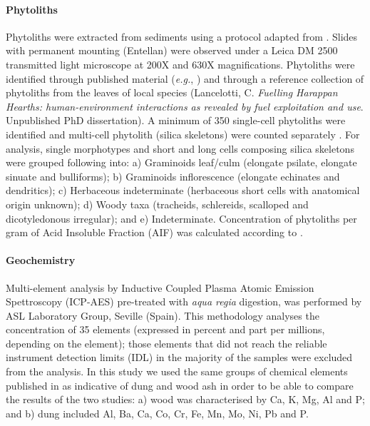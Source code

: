 \documentclass[authoryear,preprint,review,12pt]{elsarticle}
\begin{document}
\paragraph{Phytoliths}
Phytoliths were extracted from sediments using a protocol adapted from \citet{Madella1998}. Slides with permanent mounting (Entellan\textregistered) were observed under a Leica DM 2500 transmitted light microscope at 200X and 630X magnifications. Phytoliths were identified through published material (\emph{e.g.}, \citealp{Pearsall2008a,Piperno2006}) and through a reference collection of phytoliths from the leaves of local species (Lancelotti, C. \textit{Fuelling Harappan Hearths: human-environment interactions as revealed by fuel exploitation and use}. Unpublished PhD dissertation). A minimum of 350 single-cell phytoliths were identified and multi-cell phytolith (silica skeletons) were counted separately \citep{Zurro2010}. For analysis, single morphotypes and short and long cells composing silica skeletons were grouped following \citet{Lancelotti2012} into: a) Graminoids leaf/culm (elongate psilate, elongate sinuate and bulliforms); b) Graminoids inflorescence (elongate echinates and dendritics); c) Herbaceous indeterminate (herbaceous short cells with anatomical origin unknown); d) Woody taxa (tracheids, schlereids, scalloped and dicotyledonous irregular); and e) Indeterminate. Concentration of phytoliths per gram of Acid Insoluble Fraction (AIF) was calculated according to \citet{Albert2001}.
\paragraph{Geochemistry}
Multi-element analysis by Inductive Coupled Plasma Atomic Emission Spettroscopy (ICP-AES) pre-treated with \textit{aqua regia} digestion, was performed by ASL Laboratory Group, Seville (Spain). This methodology analyses the concentration of 35 elements (expressed in percent and part per millions, depending on the element); those elements that did not reach the reliable instrument detection limits (IDL) in the majority of the samples were excluded from the analysis. In this study we used the same groups of chemical elements published in \citet{Rondelli2014} as indicative of dung and wood ash in order to be able to compare the results of the two studies: a) wood was characterised by Ca, K, Mg, Al and P; and b) dung included Al, Ba, Ca, Co, Cr, Fe, Mn, Mo, Ni, Pb and P.
\end{document}
